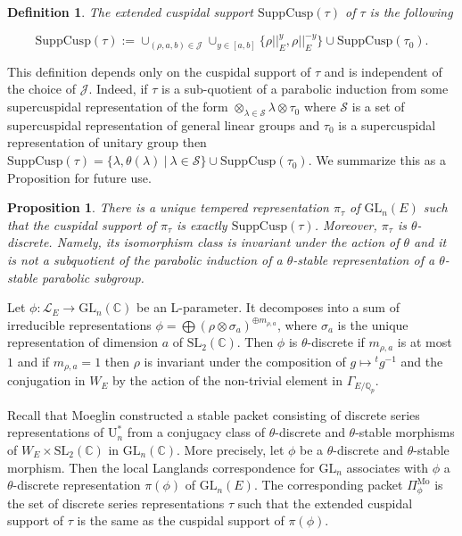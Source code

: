 \documentclass[reqno,11pt]{amsart}
\newtheorem{proposition}[theorem]{Proposition}
\newtheorem{definition}[theorem]{Definition}
\theoremstyle{remark}
\newcommand{\U}{\mathrm{U}}
\newcommand{\C}{\mathbb{C}}
\newcommand{\GL}{\mathrm{GL}}
\newcommand{\mc}{\mathcal}
\newcommand{\Q}{\mathbb{Q}}
\newcommand{\SL}{\mathrm{SL}}
\newcommand{\SuppCusp}{\mathrm{SuppCusp}}
\def\ra{\rightarrow}
\begin{document}
\begin{definition}
The extended cuspidal support $\SuppCusp (\tau)$ of $\tau$ is the following 


\[
\SuppCusp (\tau) := \cup_{(\rho, a, b) \in \mathcal{J}} \cup_{y \in [a,b]} \{ \rho ||^{y}_E, \rho ||^{-y}_E \} \cup \SuppCusp (\tau_0).
\]
\end{definition}
This definition depends only on the cuspidal support of $\tau$ and is independent of the choice of $\mc{J}$. Indeed, if $\tau$ is a sub-quotient of a parabolic induction from some supercuspidal representation of the form $ \otimes_{\lambda \in \mathcal{S}} \lambda \otimes \tau_0 $ where $ \mathcal{S}$ is a set of supercuspidal representation of general linear groups and $\tau_0$ is a supercuspidal representation of unitary group then $ \SuppCusp (\tau) = \{ \lambda, \theta(\lambda) \ | \ \lambda \in \mathcal{S} \} \cup \SuppCusp (\tau_0)$. We summarize this as a Proposition for future use.
\begin{proposition}
    There is a unique tempered representation $ \pi_{\tau} $ of $\GL_n(E)$ such that the cuspidal support of $ \pi_{\tau} $ is exactly $\SuppCusp (\tau)$. Moreover, $\pi_{\tau}$ is $\theta$-discrete. Namely, its isomorphism class is invariant under the action of $\theta$ and it is not a subquotient of the parabolic induction of a $\theta$-stable representation of a $\theta$-stable parabolic subgroup.
\end{proposition}

Let $\phi : \mc{L}_E \ra \GL_n(\C)$ be an L-parameter. It decomposes into a sum of irreducible representations $ \phi = \bigoplus (\rho \otimes \sigma_a)^{\oplus m_{\rho , a}} $, where $\sigma_a$ is the unique representation of dimension $a$ of $\SL_2(\C)$. Then $\phi$ is $\theta$-discrete if $m_{\rho , a}$ is at most $1$ and if $m_{\rho , a} = 1$ then $\rho$ is invariant under the composition of $ g \longmapsto {}^{t}g^{-1} $ and the conjugation in $W_E$ by the action of the non-trivial element in $\Gamma_{E/\Q_p}$.  

Recall that Moeglin constructed a stable packet consisting of discrete series representations of $\U^*_n$ from a conjugacy class of $\theta$-discrete and $\theta$-stable morphisms of $W_E \times \SL_2(\C)$ in $\GL_n(\C)$. More precisely, let $\phi$ be a $\theta$-discrete and $\theta$-stable morphism. Then the local Langlands correspondence for $\GL_n$ associates with $ \phi $ a $\theta$-discrete representation $\pi(\phi)$ of $\GL_n(E)$. The corresponding packet $\Pi^{\mathrm{Mo}}_{\phi}$ is the set of discrete series representations $\tau$ such that the extended cuspidal support of $\tau$ is the same as the cuspidal support of $\pi(\phi)$.
\end{document}
